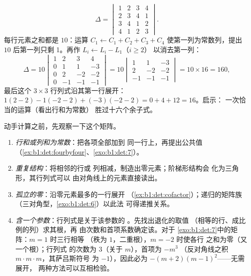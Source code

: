 \begin{example}
\label{ex:b1:det:fourbyfour}
\[
\Delta = \begin{vmatrix}
1 & 2 & 3 & 4\\
2 & 3 & 4 & 1\\
3 & 4 & 1 & 2\\
4 & 1 & 2 & 3
\end{vmatrix}.
\]
每行元素之和都是 $10$：运算 $C_1 \leftarrow C_1 + C_2 +
C_3 + C_4$ 使第一列为常数列，提出 $10$
后第一列只剩 1。再作 $L_i \leftarrow L_i - L_1$（$i \geq 2$）
以消去第一列：
\[
\Delta = 10\begin{vmatrix}
1 & 2 & 3 & 4\\
0 & 1 & 1 & -3\\
0 & 2 & -2 & -2\\
0 & -1 & -1 & -1
\end{vmatrix}
= 10\begin{vmatrix}
1 & 1 & -3\\
2 & -2 & -2\\
-1 & -1 & -1
\end{vmatrix}
= 10 \times 16 = 160,
\]
最后这个 $3\times3$ 行列式沿其第一行展开：
$1(2 - 2) - 1(-2 - 2) + (-3)(-2 - 2) = 0 + 4 + 12 = 16$。启示：
一次恰当的运算（看出行和为常数）
胜过十六个余子式。
\end{example}

\begin{method}[选择行列式的计算策略]
\label{met:b1:det:strategy}
动手计算之前，先观察一下这个矩阵。
\begin{enumerate}
  \item \emph{行和或列和为常数}：把各项全部加到
        同一行上，再提出公共值
        （\cref{ex:b1:det:fourbyfour}、\cref{exo:b1:det:7}）。
  \item \emph{重复结构}：将相邻的行或
        列相减，制造出零元素；阶梯形结构会
        化为三角形，其行列式可以
        由对角线上的元素直接读出。
  \item \emph{孤立的零}：沿零元素最多的一行展开
        （\cref{ex:b1:det:cofactor}）；递归的矩阵族
        （三对角型，\cref{exo:b1:det:6}）以此法
        可得递推关系。
  \item \emph{含一个参数}：行列式是关于该参数的
        。先找出退化的取值
        （相等的行、成比例的列）求其根，再
        由次数和首项系数确定该。对于
        \cref{exo:b1:det:7}中的矩阵：$m = 1$ 时三行相等
        （秩为 $1$，二重根），$m = -2$ 时使各行
        之和为零（又一个根）；行列式
        的次数为 $3$（关于 $m$），首项为 $-m^3$
        （反对角线之积 $m\cdot m\cdot m$，其萨吕斯符号
        为 $-1$），因此必为 $-(m+2)(m-1)^2$——无需展开，
        两种方法可以互相检验。
\end{enumerate}
\end{method}

